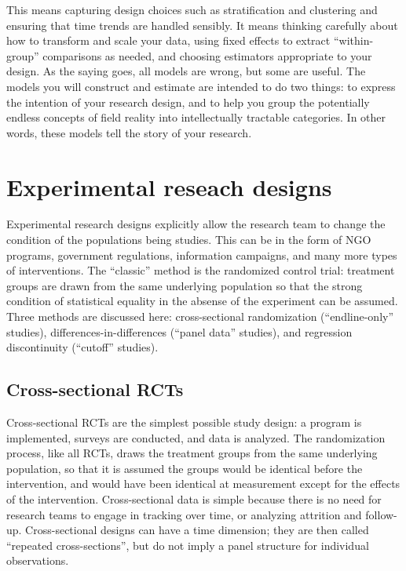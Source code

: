 This means capturing design choices
such as stratification and clustering and
ensuring that time trends are handled sensibly.
It means thinking carefully about how to transform and scale your data,
using fixed effects to extract ``within-group'' comparisons as needed,
and choosing estimators appropriate to your design.
As the saying goes, all models are wrong, but some are useful.
The models you will construct and estimate are intended to do two things:
to express the intention of your research design,
and to help you group the potentially endless concepts of field reality
into intellectually tractable categories.
In other words, these models tell the story of your research.


\section{Experimental reseach designs}

Experimental research designs explicitly allow the research team
to change the condition of the populations being studies.
This can be in the form of NGO programs, government regulations,
information campaigns, and many more types of interventions.
The ``classic'' method is the randomized control trial:
treatment groups are drawn from the same underlying population
so that the strong condition of statistical equality
in the absense of the experiment can be assumed.
Three methods are discussed here:
cross-sectional randomization (``endline-only'' studies),
differences-in-differences (``panel data'' studies),
and regression discontinuity (``cutoff'' studies).

\subsection{Cross-sectional RCTs}

Cross-sectional RCTs are the simplest possible study design:
a program is implemented, surveys are conducted, and data is analyzed.
The randomization process, like all RCTs,
draws the treatment groups from the same underlying population,
so that it is assumed the groups would be identical
before the intervention, and would have been identical at measurement
except for the effects of the intervention.
Cross-sectional data is simple because there is no need
for research teams to engage in tracking over time,
or analyzing attrition and follow-up.
Cross-sectional designs can have a time dimension;
they are then called ``repeated cross-sections'',
but do not imply a panel structure for individual observations.


